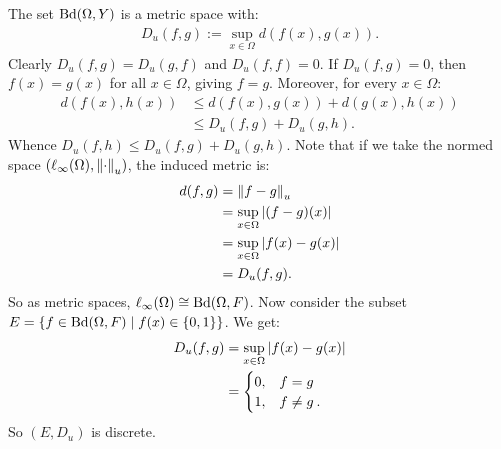     \begin{example}
        The set $\Bd(\Omega,Y)$ is a metric space with:
            \begin{equation*}
            \begin{split}
                D_u(f,g):= \sup_{x \in \Omega}d(f(x),g(x)).
            \end{split}
            \end{equation*}
        Clearly $D_u(f,g) = D_u(g,f)$ and $D_u(f,f) = 0$. If $D_u(f,g) = 0$, then $f(x) = g(x)$ for all $x \in \Omega$, giving $f = g$. Moreover, for every $x \in \Omega$:
            \begin{equation*}
            \begin{split}
                d(f(x),h(x)) &\leq d(f(x),g(x)) + d(g(x),h(x)) \\
                & \leq D_u(f,g) + D_u(g,h).
            \end{split}
            \end{equation*}
        Whence $D_u(f,h) \leq D_u(f,g) + D_u(g,h)$. Note that if we take the normed space $(\ell_\infty(\Omega),\lnorm \cdot \rnorm_u)$, the induced metric is:
            \begin{equation*}
            \begin{split}
                d(f,g)
                & = \lnorm f-g \rnorm_u \\
                & = \sup_{x \in \Omega}|(f-g)(x)| \\
                & = \sup_{x \in \Omega}|f(x) - g(x)| \\
                & = D_u(f,g).
            \end{split}
            \end{equation*}
        So as metric spaces, $\ell_\infty(\Omega) \cong \Bd(\Omega,F)$. Now consider the subset \newline $E = \{f \in \Bd(\Omega,F) \mid f(x) \in \{0,1\}\}$. We get:
            \begin{equation*}
            \begin{split}
                D_u(f,g)
                & = \sup_{x \in \Omega}|f(x) - g(x)| \\
                & = \begin{cases} 0, & f = g \\
                1, & f \neq g  \h2.\end{cases}
            \end{split}
            \end{equation*}
        So $(E,D_u)$ is discrete.
    \end{example}

